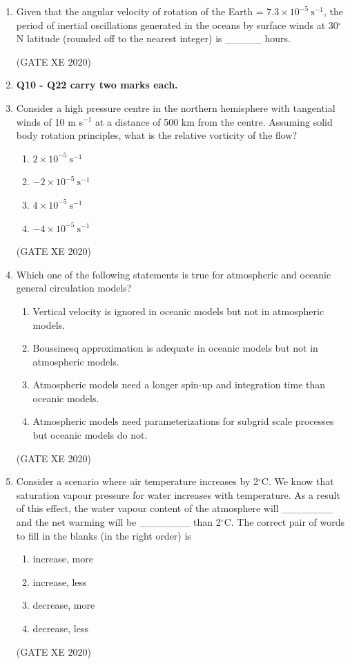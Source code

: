 \documentclass[12pt]{article}
\begin{document}
\begin{enumerate}
(GATE XE 2020)

\item Given that the angular velocity of rotation of the Earth = $7.3 \times 10^{-5}\ \mathrm{s^{-1}}$, the period of inertial oscillations generated in the oceans by surface winds at 30$^{\circ}$N latitude (rounded off to the nearest integer) is \_\_\_\_\_ hours.  

(GATE XE 2020)

\item[] \textbf{Q10 - Q22 carry two marks each.}
\item Consider a high pressure centre in the northern hemisphere with tangential winds of 10 m s$^{-1}$ at a distance of 500 km from the centre. Assuming solid body rotation principles, what is the relative vorticity of the flow?
\begin{enumerate}
\item $2 \times 10^{-5}\ \mathrm{s^{-1}}$
\item $-2 \times 10^{-5}\ \mathrm{s^{-1}}$
\item $4 \times 10^{-5}\ \mathrm{s^{-1}}$
\item $-4 \times 10^{-5}\ \mathrm{s^{-1}}$
\end{enumerate}
(GATE XE 2020)

\item Which one of the following statements is true for atmospheric and oceanic general circulation models?
\begin{enumerate}
\item Vertical velocity is ignored in oceanic models but not in atmospheric models.
\item Boussinesq approximation is adequate in oceanic models but not in atmospheric models.
\item Atmospheric models need a longer spin-up and integration time than oceanic models.
\item Atmospheric models need parameterizations for subgrid scale processes but oceanic models do not.
\end{enumerate}
(GATE XE 2020)

\item Consider a scenario where air temperature increases by 2$^\circ$C. We know that saturation vapour pressure for water increases with temperature. As a result of this effect, the water vapour content of the atmosphere will \_\_\_\_\_\_\_ and the net warming will be \_\_\_\_\_\_\_ than 2$^\circ$C. The correct pair of words to fill in the blanks (in the right order) is
\begin{enumerate}
\item increase, more
\item increase, less
\item decrease, more
\item decrease, less
\end{enumerate}
(GATE XE 2020)


\end{enumerate}
\end{document}
